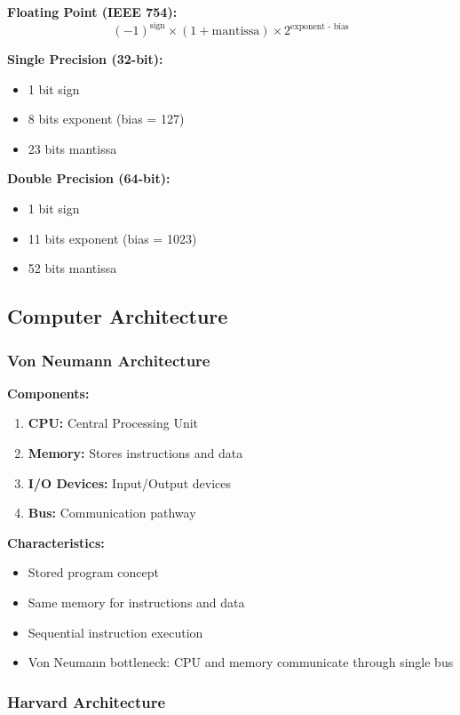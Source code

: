 \documentclass[11pt,a4paper]{article}
\begin{document}
\textbf{Floating Point (IEEE 754):}
\[
    (-1)^{\text{sign}} \times (1 + \text{mantissa}) \times 2^{\text{exponent - bias}}
\]

\textbf{Single Precision (32-bit):}
\begin{itemize}
    \item 1 bit sign
    \item 8 bits exponent (bias = 127)
    \item 23 bits mantissa
\end{itemize}

\textbf{Double Precision (64-bit):}
\begin{itemize}
    \item 1 bit sign
    \item 11 bits exponent (bias = 1023)
    \item 52 bits mantissa
\end{itemize}

\subsection{Computer Architecture}

\subsubsection{Von Neumann Architecture}

\textbf{Components:}
\begin{enumerate}
    \item \textbf{CPU:} Central Processing Unit
    \item \textbf{Memory:} Stores instructions and data
    \item \textbf{I/O Devices:} Input/Output devices
    \item \textbf{Bus:} Communication pathway
\end{enumerate}

\textbf{Characteristics:}
\begin{itemize}
    \item Stored program concept
    \item Same memory for instructions and data
    \item Sequential instruction execution
    \item Von Neumann bottleneck: CPU and memory communicate through single bus
\end{itemize}

\subsubsection{Harvard Architecture}
\end{document}
